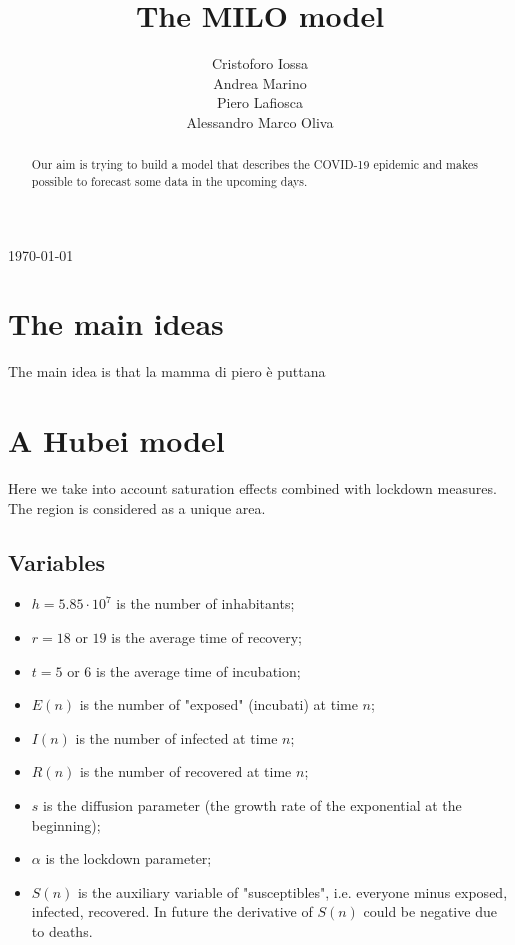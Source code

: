 \documentclass{article}
\title{The MILO model}
\author{Cristoforo Iossa \\ Andrea Marino \\ Piero Lafiosca \\ Alessandro Marco Oliva }
\date{}
\theoremstyle{definition}
\theoremstyle{plain}
\theoremstyle{plain}
\begin{document}
\maketitle
\begin{center}
\today
\end{center}

\begin{abstract}
    Our aim is trying to build a model that describes the COVID-19 epidemic and makes possible to forecast some data in the upcoming days.
\end{abstract}

\section{The main ideas}
The main idea is that la mamma di piero è puttana

\section{A Hubei model}
Here we take into account saturation effects combined with lockdown measures. The region is considered as a unique area.

\subsection{Variables}

\begin{itemize}
\item $h= 5.85 \cdot 10^7$ is the number of inhabitants;
\item $r= 18$ or $19$ is the average time of recovery;
\item $t= 5$ or $6$ is the average time of incubation;
\item $E(n)$ is the number of "exposed" (incubati) at time $n$;
\item $I(n)$ is the number of infected at time $n$;
\item $R(n)$ is the number of recovered at time $n$;
\item $s$ is the diffusion parameter (the growth rate of the exponential at the beginning);
\item $\alpha$ is the lockdown parameter;
\item $S(n)$ is the auxiliary variable of "susceptibles", i.e. everyone minus exposed, infected, recovered. In future the derivative of $S(n)$ could be negative due to deaths.

\end{itemize}
\end{document}
